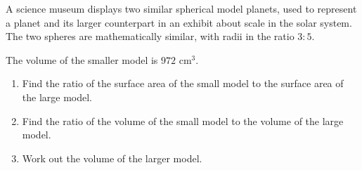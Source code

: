 \begin{question}
\noindent A science museum displays two similar spherical model planets, used to represent a planet and its larger counterpart in an exhibit about scale in the solar system. The two spheres are mathematically similar, with radii in the ratio $3:5$.

\begin{center}
\end{center}

\noindent The volume of the smaller model is $972\text{ cm}^3$.

\begin{enumerate}
    \item[(a)] Find the ratio of the surface area of the small model to the surface area of the large model.

    \vspace{3cm}

    \item[(b)] Find the ratio of the volume of the small model to the volume of the large model.

    \vspace{3cm}

    \item[(c)] Work out the volume of the larger model.

    \vspace{4cm}
\end{enumerate}
\end{question}
